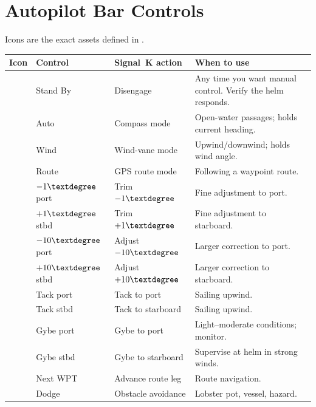 
\section{Autopilot Bar Controls}

Icons are the exact assets defined in .

\begin{longtable}{C{1.4cm}L{2.4cm}L{4.6cm}L{5.3cm}}
\toprule
{}
\color{white}\sffamily\bfseries Icon &
\color{white}\sffamily\bfseries Control &
\color{white}\sffamily\bfseries Signal~K action &
\color{white}\sffamily\bfseries When to use \\
\midrule
{}                & Stand By    & Disengage         & Any time you want manual control. Verify the helm responds. \\
           & Auto        & Compass mode      & Open-water passages; holds current heading. \\
                      & Wind        & Wind-vane mode    & Upwind/downwind; holds wind angle. \\
            & Route       & GPS route mode    & Following a waypoint route. \\
               & $-1\textdegree$ port  & Trim $-1\textdegree$ & Fine adjustment to port. \\
                & $+1\textdegree$ stbd  & Trim $+1\textdegree$ & Fine adjustment to starboard. \\
  & $-10\textdegree$ port & Adjust $-10\textdegree$ & Larger correction to port. \\
 & $+10\textdegree$ stbd & Adjust $+10\textdegree$ & Larger correction to starboard. \\
           & Tack port   & Tack to port      & Sailing upwind. \\
          & Tack stbd   & Tack to starboard & Sailing upwind. \\
  & Gybe port   & Gybe to port      & Light--moderate conditions; monitor. \\
 & Gybe stbd   & Gybe to starboard & Supervise at helm in strong winds. \\
       & Next WPT    & Advance route leg & Route navigation. \\
                      & Dodge       & Obstacle avoidance & Lobster pot, vessel, hazard. \\
\bottomrule
\end{longtable}

